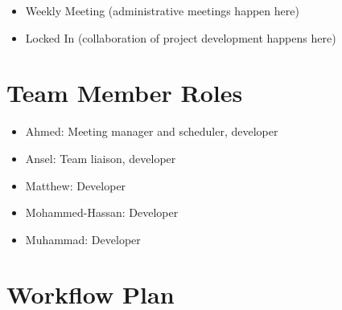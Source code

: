 \documentclass{article}
\begin{document}
\begin{itemize}
  \item Weekly Meeting (administrative meetings happen here)
  \item Locked In (collaboration of project development happens here)
\end{itemize}
\section{Team Member Roles}
\begin{itemize}
  \item Ahmed: Meeting manager and scheduler, developer
  \item Ansel: Team liaison, developer
  \item Matthew: Developer
  \item Mohammed-Hassan: Developer
  \item Muhammad: Developer
\end{itemize}

\section{Workflow Plan}
\end{document}
